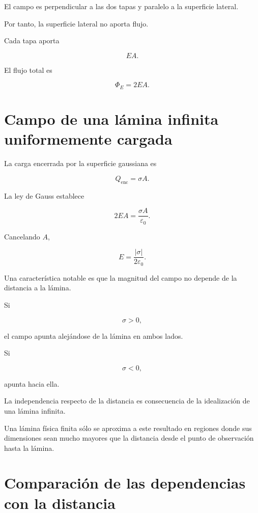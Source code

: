 El campo es perpendicular a las dos tapas y paralelo a la superficie lateral.

Por tanto, la superficie lateral no aporta flujo.

Cada tapa aporta

\[
EA.
\]

El flujo total es

\[
\Phi_E=2EA.
\]


\section{Campo de una lámina infinita uniformemente cargada}

La carga encerrada por la superficie gaussiana es

\[
Q_{\text{enc}}=\sigma A.
\]

La ley de Gauss establece

\[
2EA=\frac{\sigma A}{\varepsilon_0}.
\]

Cancelando \(A\),

\begin{equation}
\boxed{
E=\frac{|\sigma|}{2\varepsilon_0}
}.
\label{eq:campo_lamina_infinita}
\end{equation}

Una característica notable es que la magnitud del campo no depende de la distancia
a la lámina.

Si

\[
\sigma>0,
\]

el campo apunta alejándose de la lámina en ambos lados.

Si

\[
\sigma<0,
\]

apunta hacia ella.


\begin{interpretacion}

La independencia respecto de la distancia es consecuencia de la idealización de una
lámina infinita.

Una lámina física finita sólo se aproxima a este resultado en regiones donde sus
dimensiones sean mucho mayores que la distancia desde el punto de observación hasta
la lámina.

\end{interpretacion}


\section{Comparación de las dependencias con la distancia}

